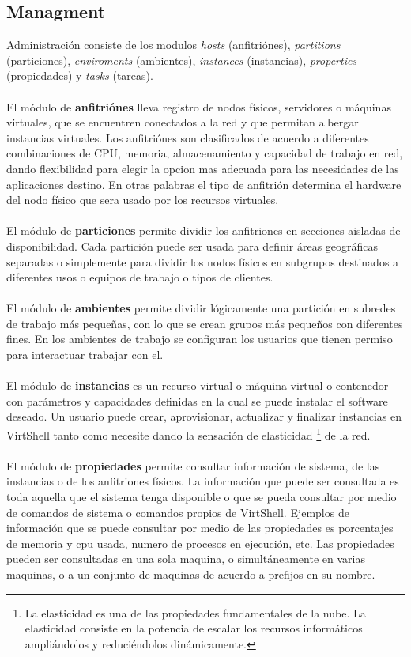 \subsection{Managment}
Administración consiste de los modulos \emph{hosts} (anfitriónes), \emph{partitions} (particiones), \emph{enviroments} (ambientes), \emph{instances} (instancias), \emph{properties} (propiedades) y \emph{tasks} (tareas). \\
\\
El módulo de \textbf{anfitriónes} lleva registro de nodos físicos, servidores o máquinas virtuales, que se encuentren conectados a la red y que permitan albergar instancias virtuales. Los anfitriónes son clasificados de acuerdo a diferentes combinaciones de CPU, memoria, almacenamiento y capacidad de trabajo en red, dando flexibilidad para elegir la opcion mas adecuada para las necesidades de las aplicaciones destino. En otras palabras el tipo de anfitrión determina el hardware del nodo físico que sera usado por los recursos virtuales.\\
\\
El módulo de \textbf{particiones} permite dividir los anfitriones en secciones aisladas de disponibilidad. Cada partición puede ser usada para definir áreas geográficas separadas o simplemente para dividir los nodos físicos en subgrupos destinados a diferentes usos o equipos de trabajo o tipos de clientes.\\
\\
El módulo de \textbf{ambientes} permite dividir lógicamente una partición en subredes de trabajo más pequeñas, con lo que se crean grupos más pequeños con diferentes fines. En los ambientes de trabajo se configuran los usuarios que tienen permiso para interactuar trabajar con el.\\
\\
El módulo de \textbf{instancias} es un recurso virtual o máquina virtual o contenedor con parámetros y capacidades definidas en la cual se puede instalar el software deseado. Un usuario puede crear, aprovisionar, actualizar y finalizar instancias en VirtShell tanto como necesite dando la sensación de elasticidad \footnote{La elasticidad es una de las propiedades fundamentales de la nube. La elasticidad consiste en la potencia de escalar los recursos informáticos ampliándolos y reduciéndolos dinámicamente.} de la red.\\
\\
El módulo de \textbf{propiedades} permite consultar información de sistema, de las instancias o de los anfitriones físicos. La información que puede ser consultada es toda aquella que el sistema tenga disponible o que se pueda consultar por medio de comandos de sistema o comandos propios de VirtShell. Ejemplos de información que se puede consultar por medio de las propiedades es porcentajes de memoria y cpu usada, numero de procesos en ejecución, etc. Las propiedades pueden ser consultadas en una sola maquina, o simultáneamente en varias maquinas, o a un conjunto de maquinas de acuerdo a prefijos en su nombre.\\
